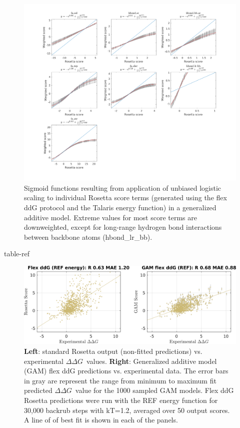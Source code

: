\documentclass{article}
\newcommand\ddg{$\Delta\Delta G$}
\begin{document}
\begin{figure}
  \centering
  \includegraphics[width=\textwidth,keepaspectratio]{figures/zemu-sigmoid2-tal-feats.png}
  \caption[Sigmoid fit Rosetta score function terms]{
    Sigmoid functions resulting from application of unbiased logistic scaling to individual Rosetta score terms (generated using the flex ddG protocol and the Talaris energy function) in a generalized additive model. Extreme values for most score terms are downweighted, except for long-range hydrogen bond interactions between backbone atoms (hbond\_lr\_bb).
  } \label{fig:t14-fits-feats}
\end{figure}

{table-ref}

\begin{figure}
  \includegraphics[width=\textwidth,keepaspectratio]{figures/zemu-sigmoid2-corrs-supp.png}
  \caption[]{
    \textbf{Left}: standard Rosetta output (non-fitted predictions) vs. experimental \ddg\ values.
    \textbf{Right}: Generalized additive model (GAM) flex ddG predictions vs. experimental data.
    The error bars in gray are represent the range from minimum to maximum fit predicted \ddg\ value for the 1000 sampled GAM models.
    Flex ddG Rosetta predictions were run with the REF energy function for 30,000 backrub steps with kT=1.2, averaged over 50 output scores.
    A line of of best fit is shown in each of the panels.
  } \label{fig:t14-fit-scatter-supp}
\end{figure}
\end{document}
